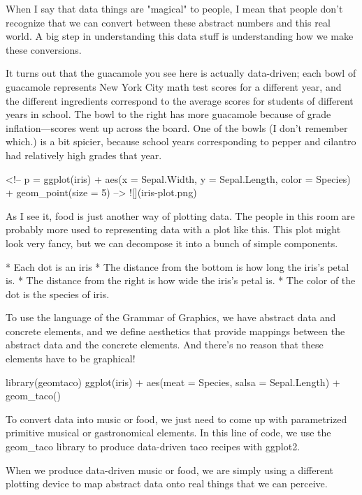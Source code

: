 \documentclass{acm_proc_article-sp}
\begin{document}
When I say that data things are "magical" to people, I mean that
people don't recognize that we can convert between these abstract
numbers and this real world. A big step in understanding this data
stuff is understanding how we make these conversions.

It turns out that the guacamole you see here is actually data-driven;
each bowl of guacamole represents New York City math test scores for
a different year, and the different ingredients correspond to the
average scores for students of different years in school. The bowl
to the right has more guacamole because of grade inflation---scores
went up across the board. One of the bowls (I don't remember which.)
is a bit spicier, because school years corresponding to pepper and
cilantro had relatively high grades that year.

<!--
p = ggplot(iris) + aes(x = Sepal.Width, y = Sepal.Length, color = Species) + geom_point(size = 5)                   
-->
![](iris-plot.png)

As I see it, food is just another way of plotting data. The people
in this room are probably more used to representing data with a plot like this.
This plot
might look very fancy, but we can decompose it into a bunch of simple
components.

* Each dot is an iris
* The distance from the bottom is how long the iris's petal is.
* The distance from the right is how wide the iris's petal is.
* The color of the dot is the species of iris.

To use the language of the Grammar of Graphics, we have abstract data
and concrete elements, and we define aesthetics that provide mappings
between the abstract data and the concrete elements.
And there's no reason that these elements have to be graphical!

    library(geomtaco)
    ggplot(iris) + aes(meat = Species, salsa = Sepal.Length) + geom_taco()

To convert
data into music or food, we just need to come up with parametrized primitive
musical or gastronomical elements. In this line of code, we use the geom\_taco
library to produce data-driven taco recipes with ggplot2.

When we produce data-driven music or food,
we are simply using a different plotting device to map abstract data
onto real things that we can perceive.
\end{document}

